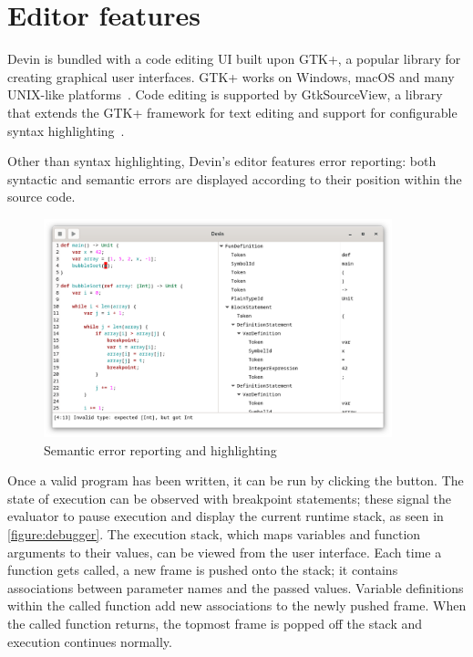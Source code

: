 \documentclass[UdineBachThesis,american,11pt]{PhdThesis}
\begin{document}
  \section{Editor features}
  \label{section:editor-features}

  Devin is bundled with a code editing UI built upon GTK+, a popular library for
  creating graphical user interfaces. GTK+ works on Windows, macOS and many
  UNIX-like platforms~\cite{gtk+}. Code editing is supported by GtkSourceView, a
  library that extends the GTK+ framework for text editing and support for
  configurable syntax highlighting~\cite{gtksourceview}.

  Other than syntax highlighting, Devin's editor features error reporting: both
  syntactic and semantic errors are displayed according to their position within
  the source code.

  \begin{figure}[H]
    \centering
    \includegraphics[width=0.9\textwidth]{4.png}
    \caption{Semantic error reporting and highlighting}
  \end{figure}

  \pagebreak

  Once a valid program has been written, it can be run by clicking the
  {\blacktriangleright} button. The state of execution can be observed with
  breakpoint statements; these signal the evaluator to pause execution and
  display the current runtime stack, as seen in \autoref{figure:debugger}. The
  execution stack, which maps variables and function arguments to their values,
  can be viewed from the user interface. Each time a function gets called, a new
  frame is pushed onto the stack; it contains associations between parameter
  names and the passed values. Variable definitions within the called function
  add new associations to the newly pushed frame. When the called function
  returns, the topmost frame is popped off the stack and execution continues
  normally.
\end{document}
